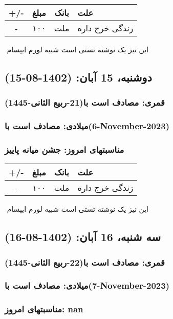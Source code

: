 \documentclass{article}
\newcommand{\rnote}[1]{\marginpar{\textcolor{color}{\StrSubstitute{\##1}{ }{\_}}}}
\newcommand{\myRow}[4]{
    #1 & #2 & #3 & #4 \\ \hline
}
\begin{document}
\begin{tabular}{ | c | c | c | p{5cm} |}
    \hline
    \myRow{ +/- }{مبلغ}{بانک}{علت}
    \myRow{-}{۱۰۰}{ملت}{زندگی خرج داره}
\end{tabular}
\newline
\newline

‌
\rnote{تست}
این نیز یک نوشته تستی است شبیه لورم ایپسام




\newpage
{}
\textcolor{color}{
\section{ دوشنبه، 15 آبان: (1402-08-15) }
\subsubsection*{قمری: مصادف است با(21-ربیع الثانی-1445)} 
\subsubsection*{میلادی: مصادف است با(6-November-2023)}
\subsubsection*{مناسبتهای امروز: جشن میانه پاییز}
}


\begin{tabular}{ | c | c | c | p{5cm} |}
    \hline
    \myRow{ +/- }{مبلغ}{بانک}{علت}
    \myRow{-}{۱۰۰}{ملت}{زندگی خرج داره}
\end{tabular}
\newline
\newline

‌
\rnote{تست}
این نیز یک نوشته تستی است شبیه لورم ایپسام




\newpage
{}
\textcolor{color}{
\section{ سه شنبه، 16 آبان: (1402-08-16) }
\subsubsection*{قمری: مصادف است با(22-ربیع الثانی-1445)} 
\subsubsection*{میلادی: مصادف است با(7-November-2023)}
\subsubsection*{مناسبتهای امروز: nan}
}
\end{document}
